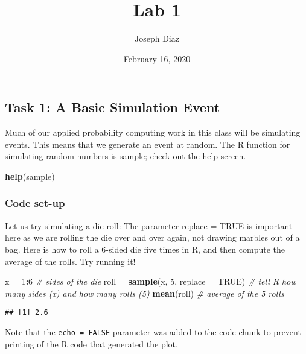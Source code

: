 \documentclass[
]{article}
\title{Lab 1}
\author{Joseph Diaz}
\date{February 16, 2020}
\newenvironment{Shaded}{\begin{snugshade}}{\end{snugshade}}
\newcommand{\CommentTok}[1]{\textcolor[rgb]{0.56,0.35,0.01}{\textit{#1}}}
\newcommand{\DataTypeTok}[1]{\textcolor[rgb]{0.13,0.29,0.53}{#1}}
\newcommand{\DecValTok}[1]{\textcolor[rgb]{0.00,0.00,0.81}{#1}}
\newcommand{\KeywordTok}[1]{\textcolor[rgb]{0.13,0.29,0.53}{\textbf{#1}}}
\newcommand{\NormalTok}[1]{#1}
\newcommand{\OperatorTok}[1]{\textcolor[rgb]{0.81,0.36,0.00}{\textbf{#1}}}
\newcommand{\OtherTok}[1]{\textcolor[rgb]{0.56,0.35,0.01}{#1}}
\newcommand{\StringTok}[1]{\textcolor[rgb]{0.31,0.60,0.02}{#1}}
\begin{document}
\maketitle

\hypertarget{task-1-a-basic-simulation-event}{%
\subsection{Task 1: A Basic Simulation
Event}\label{task-1-a-basic-simulation-event}}

Much of our applied probability computing work in this class will be
simulating events. This means that we generate an event at random. The R
function for simulating random numbers is sample; check out the help
screen.

\begin{Shaded}
\begin{Highlighting}[]
\KeywordTok{help}\NormalTok{(sample)}
\end{Highlighting}
\end{Shaded}

\hypertarget{code-set-up}{%
\subsubsection{Code set-up}\label{code-set-up}}

Let us try simulating a die roll: The parameter replace = TRUE is
important here as we are rolling the die over and over again, not
drawing marbles out of a bag. Here is how to roll a 6-sided die five
times in R, and then compute the average of the rolls. Try running it!

\begin{Shaded}
\begin{Highlighting}[]
\NormalTok{x =}\StringTok{ }\DecValTok{1}\OperatorTok{:}\DecValTok{6}  \CommentTok{# sides of the die}
\NormalTok{roll =}\StringTok{ }\KeywordTok{sample}\NormalTok{(x, }\DecValTok{5}\NormalTok{, }\DataTypeTok{replace =} \OtherTok{TRUE}\NormalTok{)  }\CommentTok{# tell R how many sides (x) and how many rolls (5)}
\KeywordTok{mean}\NormalTok{(roll) }\CommentTok{# average of the 5 rolls}
\end{Highlighting}
\end{Shaded}

\begin{verbatim}
## [1] 2.6
\end{verbatim}

Note that the \texttt{echo\ =\ FALSE} parameter was added to the code
chunk to prevent printing of the R code that generated the plot.
\end{document}
